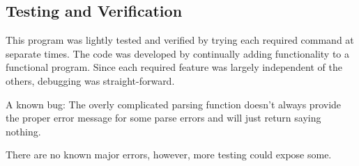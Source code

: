 \documentclass[11pt,a4paper]{article}
\newcommand{\nl}{\vspace{10pt}}
\begin{document}
\flushleft
\subsection*{Testing and Verification}

This program was lightly tested and verified by trying each required command at separate times. The code was developed by continually adding functionality to a functional program. Since each required feature was largely independent of the others, debugging was straight-forward.\nl

A known bug: The overly complicated parsing function doesn't always provide the proper error message for some parse errors and will just return saying nothing. \nl

There are no known major errors, however, more testing could expose some.
\end{document}

